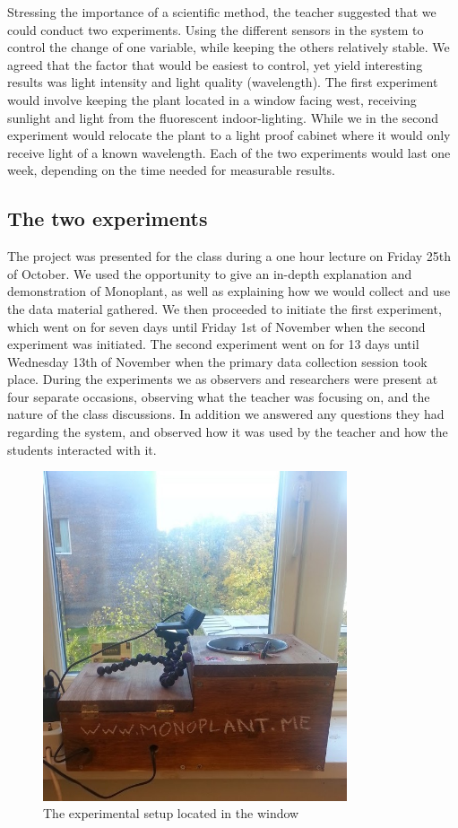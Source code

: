 Stressing the importance of a scientific method, the teacher suggested that we could conduct two experiments. Using the different sensors in the system to control the change of one variable, while keeping the others relatively stable. We agreed that the factor that would be easiest to control, yet yield interesting results was light intensity and light quality (wavelength). The first experiment would involve keeping the plant located in a window facing west, receiving sunlight and light from the fluorescent indoor-lighting. While we in the second experiment would relocate the plant to a light proof cabinet where it would only receive light of a known wavelength. Each of the two experiments would last one week, depending on the time needed for measurable results.

\subsection{The two experiments}
The project was presented for the class during a one hour lecture on Friday 25th of October. We used the opportunity to give an in-depth explanation and demonstration of Monoplant, as well as explaining how we would collect and use the data material gathered. We then proceeded to initiate the first experiment, which went on for seven days until Friday 1st of November when the second experiment was initiated. The second experiment went on for 13 days until Wednesday 13th of November when the primary data collection session took place. During the experiments we as observers and researchers were present at four separate occasions, observing what the teacher was focusing on, and the nature of the class discussions. In addition we answered any questions they had regarding the system, and observed how it was used by the teacher and how the students interacted with it. 

\begin{figure}
\centering
\includegraphics[width=0.8\textwidth]{img/empiricalsetting/window.jpg}
\caption{The experimental setup located in the window}
\label{fig:windowplant}
\end{figure}

